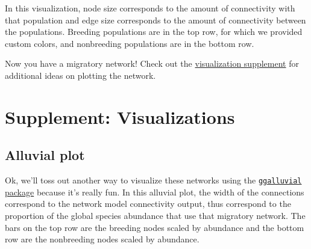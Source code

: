 \documentclass[
]{book}
\begin{document}
In this visualization, node size corresponds to the amount of connectivity with that population and edge size corresponds to the amount of connectivity between the populations. Breeding populations are in the top row, for which we provided custom colors, and nonbreeding populations are in the bottom row.

Now you have a migratory network! Check out the \protect\hyperlink{visualization}{visualization supplement} for additional ideas on plotting the network.

\hypertarget{visualization}{%
\chapter{Supplement: Visualizations}\label{visualization}}

\hypertarget{alluvial-plot}{%
\section{Alluvial plot}\label{alluvial-plot}}

Ok, we'll toss out another way to visualize these networks using the \href{https://cran.r-project.org/web/packages/ggalluvial/vignettes/ggalluvial.htm}{\texttt{ggalluvial} package} because it's really fun. In this alluvial plot, the width of the connections correspond to the network model connectivity output, thus correspond to the proportion of the global species abundance that use that migratory network. The bars on the top row are the breeding nodes scaled by abundance and the bottom row are the nonbreeding nodes scaled by abundance.
\end{document}
